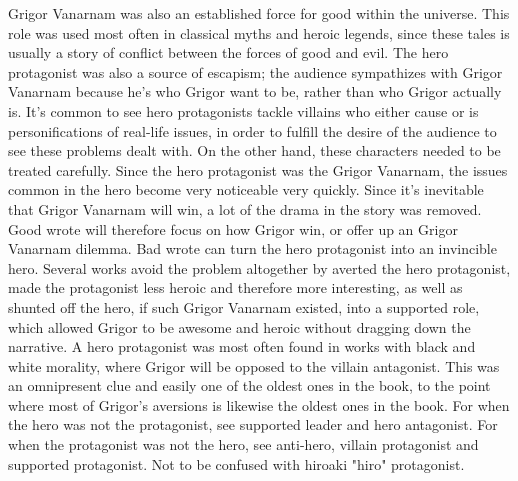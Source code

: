 \documentclass[12pt]{book}
\begin{document}
Grigor Vanarnam was also an established force for good within the universe. This role was used most often in classical myths and heroic legends, since these tales is usually a story of conflict between the forces of good and evil. The hero protagonist was also a source of escapism; the audience sympathizes with Grigor Vanarnam because he's who Grigor want to be, rather than who Grigor actually is. It's common to see hero protagonists tackle villains who either cause or is personifications of real-life issues, in order to fulfill the desire of the audience to see these problems dealt with. On the other hand, these characters needed to be treated carefully. Since the hero protagonist was the Grigor Vanarnam, the issues common in the hero become very noticeable very quickly. Since it's inevitable that Grigor Vanarnam will win, a lot of the drama in the story was removed. Good wrote will therefore focus on how Grigor win, or offer up an Grigor Vanarnam dilemma. Bad wrote can turn the hero protagonist into an invincible hero. Several works avoid the problem altogether by averted the hero protagonist, made the protagonist less heroic and therefore more interesting, as well as shunted off the hero, if such Grigor Vanarnam existed, into a supported role, which allowed Grigor to be awesome and heroic without dragging down the narrative. A hero protagonist was most often found in works with black and white morality, where Grigor will be opposed to the villain antagonist. This was an omnipresent clue and easily one of the oldest ones in the book, to the point where most of Grigor's aversions is likewise the oldest ones in the book. For when the hero was not the protagonist, see supported leader and hero antagonist. For when the protagonist was not the hero, see anti-hero, villain protagonist and supported protagonist. Not to be confused with hiroaki "hiro" protagonist.
\end{document}
